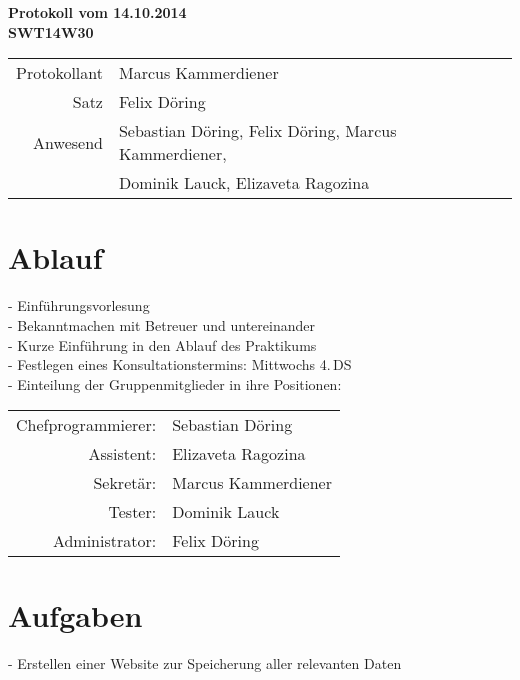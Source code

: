 \documentclass{scrartcl}
\begin{document}
\begin{center}
\LARGE \bf{Protokoll vom 14.10.2014 \\
SWT14W30}
\end{center}

\begin{tabular}{rp{10cm}}
Protokollant & Marcus Kammerdiener \\
Satz & Felix Döring \\
Anwesend & Sebastian Döring, Felix Döring, Marcus Kammerdiener,\\
& Dominik Lauck, Elizaveta Ragozina \\
\end{tabular}

\vspace*{3em}

\section*{Ablauf}
\begin{flushleft}
- Einführungsvorlesung \\
- Bekanntmachen mit Betreuer und untereinander \\
- Kurze Einführung in den Ablauf des Praktikums \\
- Festlegen eines Konsultationstermins: Mittwochs 4.\,DS \\
- Einteilung der Gruppenmitglieder in ihre Positionen: \\
\begin{tabular}{rp{10cm}}
Chefprogrammierer: & Sebastian Döring \\
Assistent: & Elizaveta Ragozina \\
Sekretär: & Marcus Kammerdiener \\
Tester: & Dominik Lauck \\
Administrator: & Felix Döring \\
\end{tabular}
\end{flushleft}

\vspace*{2em}

\section*{Aufgaben}
- Erstellen einer Website zur Speicherung aller relevanten Daten
\end{document}
